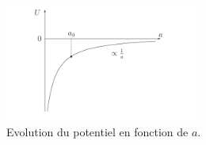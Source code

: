 \documentclass[a4paper,12pt]{report}
\theoremstyle{plain}
\theoremstyle{plain}
\begin{document}
 \begin{figure}[h]
\begin{center}
	\begin{minipage}{14pc}
\includegraphics[width=15pc]{t9.png}
\caption{Evolution du potentiel en fonction de $a$.}
\end{minipage}\hspace{3pc}%
\end{center}
\end{figure}
\end{document}

